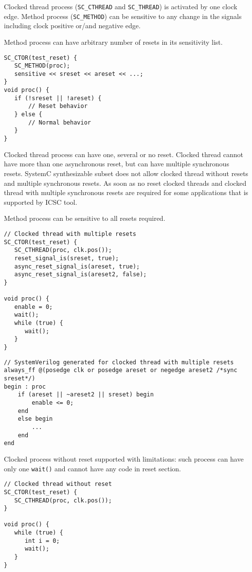 Clocked thread process ({\tt SC\_CTHREAD} and {\tt SC\_THREAD}) is activated by one clock edge. Method process ({\tt SC\_METHOD}) can be sensitive to any change in the signals including clock positive or/and negative edge.

Method process can have arbitrary number of resets in its sensitivity list. 
\begin{lstlisting}[style=mycpp]
SC_CTOR(test_reset) {
   SC_METHOD(proc);
   sensitive << sreset << areset << ...;       
}
void proc() {
   if (!sreset || !areset) {
       // Reset behavior
   } else {
       // Normal behavior
   }
}
\end{lstlisting}

Clocked thread process can have one, several or no reset. Clocked thread cannot have more than one asynchronous reset, but can have multiple synchronous resets. SystemC synthesizable subset does not allow clocked thread without resets and multiple synchronous resets. As soon as no reset clocked threads and clocked thread with multiple synchronous resets are required for some applications that is supported by ICSC tool. 

Method process can be sensitive to all resets required.

\begin{lstlisting}[style=mycpp]
// Clocked thread with multiple resets
SC_CTOR(test_reset) {
   SC_CTHREAD(proc, clk.pos());
   reset_signal_is(sreset, true);
   async_reset_signal_is(areset, true);
   async_reset_signal_is(areset2, false);       
}

void proc() {
   enable = 0;
   wait();
   while (true) {
      wait();
   }
}
\end{lstlisting}
%
\begin{lstlisting}[style=mycpp]
// SystemVerilog generated for clocked thread with multiple resets
always_ff @(posedge clk or posedge areset or negedge areset2 /*sync sreset*/) 
begin : proc
    if (areset || ~areset2 || sreset) begin
        enable <= 0;        
    end
    else begin
        ...
    end
end
\end{lstlisting}

Clocked process without reset supported with limitations: such process can have only one {\tt wait()} and cannot have any code in reset section.

\begin{lstlisting}[style=mycpp]
// Clocked thread without reset
SC_CTOR(test_reset) {
   SC_CTHREAD(proc, clk.pos());
}

void proc() {
   while (true) {
      int i = 0;
      wait();
   }
}
\end{lstlisting}

